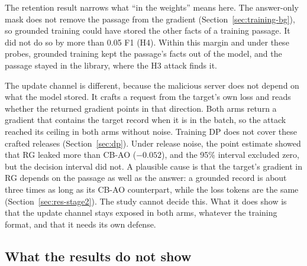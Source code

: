 \documentclass[11pt]{article}
\begin{document}
The retention result narrows what ``in the weights'' means here. The answer-only mask does not remove the passage from the gradient (Section~\ref{sec:training-bg}), so grounded training could have stored the other facts of a training passage. It did not do so by more than 0.05 F1 (H4). Within this margin and under these probes, grounded training kept the passage's facts out of the model, and the passage stayed in the library, where the H3 attack finds it.

The update channel is different, because the malicious server does not depend on what the model stored. It crafts a request from the target's own loss and reads whether the returned gradient points in that direction. Both arms return a gradient that contains the target record when it is in the batch, so the attack reached its ceiling in both arms without noise. Training DP does not cover these crafted releases (Section~\ref{sec:dp}). Under release noise, the point estimate showed that RG leaked more than CB-AO ($-0.052$), and the 95\% interval excluded zero, but the decision interval did not. A plausible cause is that the target's gradient in RG depends on the passage as well as the answer: a grounded record is about three times as long as its CB-AO counterpart, while the loss tokens are the same (Section~\ref{sec:res-stage2}). The study cannot decide this. What it does show is that the update channel stays exposed in both arms, whatever the training format, and that it needs its own defense.

\subsection{What the results do not show}\label{sec:falsify}
\end{document}
